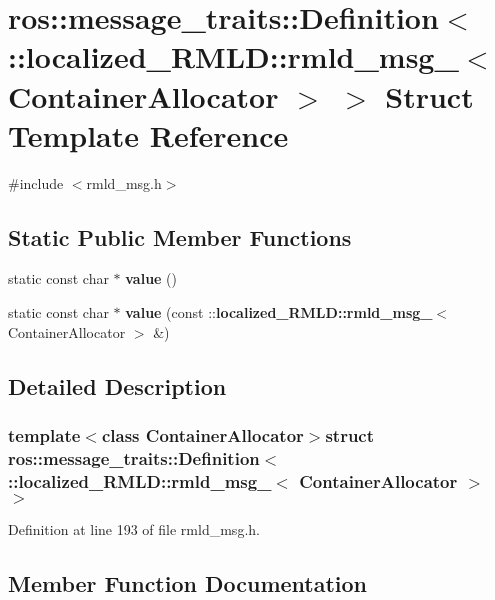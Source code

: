 \section{ros::message\_\-traits::Definition$<$ ::localized\_\-RMLD::rmld\_\-msg\_\-$<$ ContainerAllocator $>$ $>$ Struct Template Reference}
\label{structros_1_1message__traits_1_1Definition_3_01_1_1localized__RMLD_1_1rmld__msg___3_01ContainerAllocator_01_4_01_4}


{\ttfamily \#include $<$rmld\_\-msg.h$>$}

\subsection*{Static Public Member Functions}
\begin{DoxyCompactItemize}
\item 
static const char $\ast$ {\bf value} ()
\item 
static const char $\ast$ {\bf value} (const ::{\bf localized\_\-RMLD::rmld\_\-msg\_\-}$<$ ContainerAllocator $>$ \&)
\end{DoxyCompactItemize}


\subsection{Detailed Description}
\subsubsection*{template$<$class ContainerAllocator$>$struct ros::message\_\-traits::Definition$<$ ::localized\_\-RMLD::rmld\_\-msg\_\-$<$ ContainerAllocator $>$ $>$}



Definition at line 193 of file rmld\_\-msg.h.



\subsection{Member Function Documentation}
